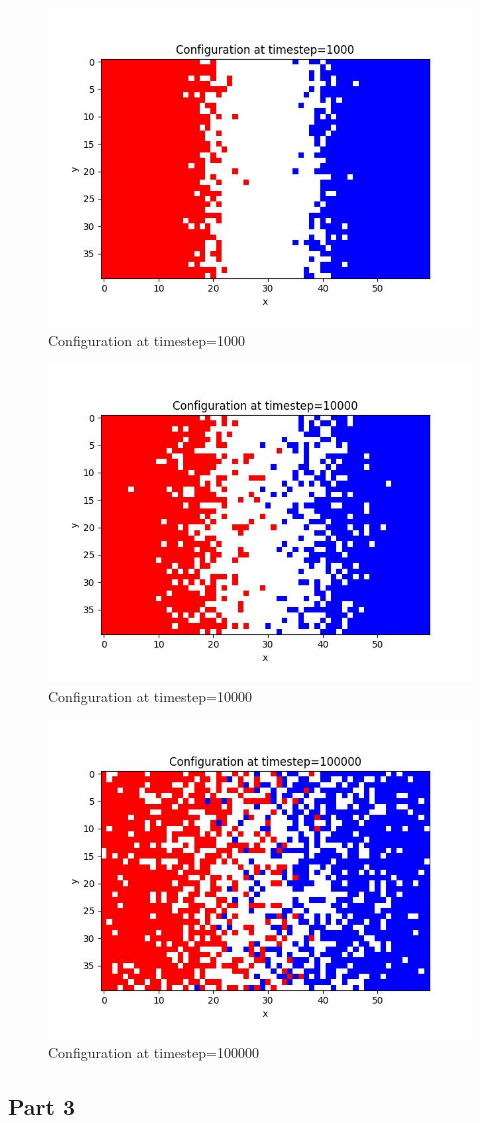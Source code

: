 \documentclass{article}
\begin{document}
\begin{figure}[htbp]
    \centering
    \includegraphics[width=0.5\linewidth]{Part_4_2_timestep=1000.jpeg}
    \caption{Configuration at timestep=1000}
\end{figure}
\begin{figure}[htbp]
    \centering
    \includegraphics[width=0.5\linewidth]{Part_4_2_timestep=10000.jpeg}
    \caption{Configuration at timestep=10000}
\end{figure}
\begin{figure}[htbp]
    \centering
    \includegraphics[width=0.5\linewidth]{Part_4_2_timestep=100000.jpeg}
    \caption{Configuration at timestep=100000}
\end{figure}
\subsection{Part 3}
\end{document}
